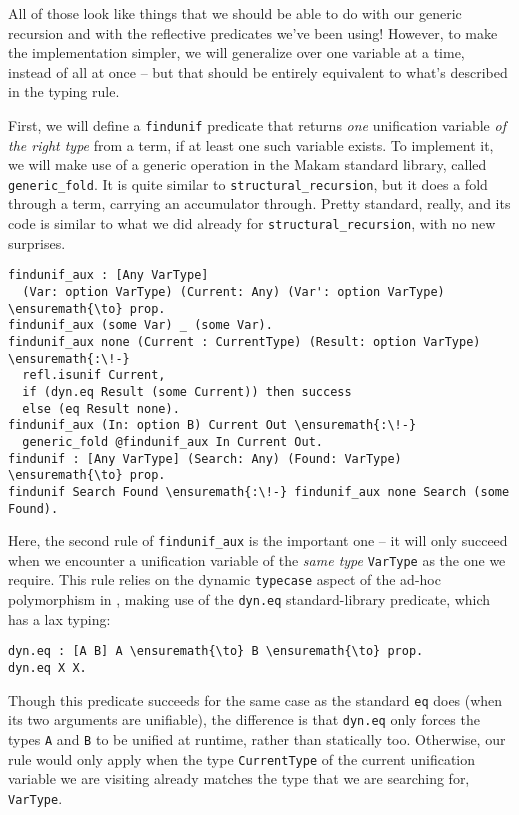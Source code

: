 All of those look like things that we should be able to do with our
generic recursion and with the reflective predicates we've been using!
However, to make the implementation simpler, we will generalize over one
variable at a time, instead of all at once -- but that should be
entirely equivalent to what's described in the typing rule.

First, we will define a \texttt{findunif} predicate that returns
\emph{one} unification variable \emph{of the right type} from a term, if
at least one such variable exists. To implement it, we will make use of
a generic operation in the Makam standard library, called
\texttt{generic\_fold}. It is quite similar to
\texttt{structural\_recursion}, but it does a fold through a term,
carrying an accumulator through. Pretty standard, really, and its code
is similar to what we did already for \texttt{structural\_recursion},
with no new surprises.

\begin{verbatim}
findunif_aux : [Any VarType]
  (Var: option VarType) (Current: Any) (Var': option VarType) \ensuremath{\to} prop.
findunif_aux (some Var) _ (some Var).
findunif_aux none (Current : CurrentType) (Result: option VarType) \ensuremath{:\!-}
  refl.isunif Current,
  if (dyn.eq Result (some Current)) then success
  else (eq Result none).
findunif_aux (In: option B) Current Out \ensuremath{:\!-}
  generic_fold @findunif_aux In Current Out.
findunif : [Any VarType] (Search: Any) (Found: VarType) \ensuremath{\to} prop.
findunif Search Found \ensuremath{:\!-} findunif_aux none Search (some Found).
\end{verbatim}

Here, the second rule of \texttt{findunif\_aux} is the important one --
it will only succeed when we encounter a unification variable of the
\emph{same type} \texttt{VarType} as the one we require. This rule
relies on the dynamic \texttt{typecase} aspect of the ad-hoc
polymorphism in \lamprolog, making use of the \texttt{dyn.eq}
standard-library predicate, which has a lax typing:

\begin{verbatim}
dyn.eq : [A B] A \ensuremath{\to} B \ensuremath{\to} prop.
dyn.eq X X.
\end{verbatim}

Though this predicate succeeds for the same case as the standard
\texttt{eq} does (when its two arguments are unifiable), the difference
is that \texttt{dyn.eq} only forces the types \texttt{A} and \texttt{B}
to be unified at runtime, rather than statically too. Otherwise, our
rule would only apply when the type \texttt{CurrentType} of the current
unification variable we are visiting already matches the type that we
are searching for, \texttt{VarType}.

